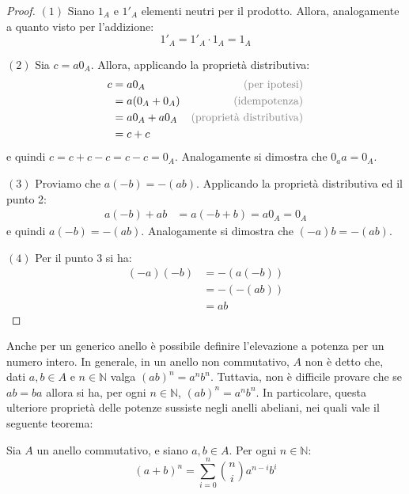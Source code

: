 \begin{proof}
	$(1)$ Siano $1_{A}$ e $1'_{A}$ elementi neutri per il prodotto. Allora, analogamente a quanto visto per l'addizione:
	\begin{displaymath}
		1'_{A} = 1'_{A} \cdot 1_{A} = 1_{A}
	\end{displaymath}
	
	$(2)$ Sia $c = a 0_{A}$. Allora, applicando la proprietà distributiva:
	\begin{align*}
		c &= a 0_{A} & \text{\textcolor{gray}{(per ipotesi)}}\\
		&= a(0_{A}+0_{A}) & \text{\textcolor{gray}{(idempotenza)}}\\
		&= a0_{A} +a0_{A} & \text{\textcolor{gray}{(proprietà distributiva)}}\\
		&= c+c\\
	\end{align*}
	e quindi $c=c+c-c=c-c = 0_{A}$. Analogamente si dimostra che $0_{a} a = 0_{A}$.
	
	$(3)$ Proviamo che $a(-b)=-(ab)$. Applicando la proprietà distributiva ed il punto 2:
	\begin{align*}
		a(-b)+ab&=a(-b+b)=a0_{A}=0_{A}
	\end{align*}
	e quindi $a(-b) =-(ab)$. Analogamente si dimostra che $(-a)b=-(ab)$.
	
	$(4)$ Per il punto 3 si ha:
	\begin{align*}
		(-a)(-b)&=-(a(-b))\\
		&=-(-(ab))\\
		&=ab
	\end{align*}
\end{proof}

Anche per un generico anello è possibile definire l'elevazione a potenza per un numero intero.  In generale, in un anello non commutativo, $A$ non è detto che, dati $a,b \in A$ e $n \in \mathbb{N}$ valga $(ab)^{n}=a^{n}b^{n}$. Tuttavia, non è difficile provare che se $ab=ba$ allora si ha, per ogni $n \in \mathbb{N}$, $(ab)^{n}=a^{n}b^{n}$. In particolare, questa ulteriore proprietà delle potenze sussiste negli anelli abeliani, nei quali vale il seguente teorema:

\begin{teorbox}
	Sia $A$ un anello commutativo, e siano $a,b \in A$. Per ogni $n \in \mathbb{N}$:
	\begin{equation}
		(a+b)^{n}= \sum_{i=0}^{n}\binom{n}{i}a^{n-i}b^{i}
	\end{equation}
\end{teorbox}

